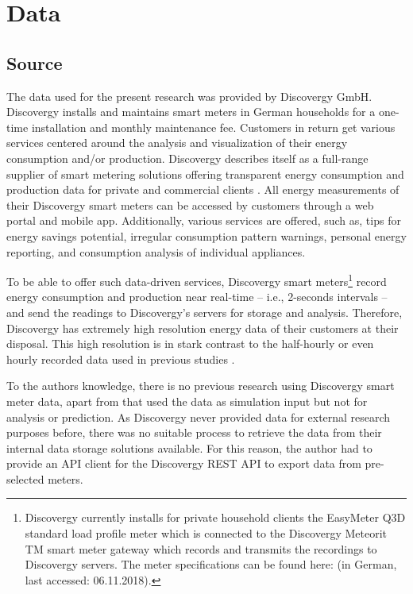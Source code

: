
\section{Data}\label{Sec:Data}




\subsection{Source}\label{Sec:Data;Subsec:Source}

The data used for the present research was provided by Discovergy GmbH. Discovergy installs and maintains smart meters in German households for a one-time installation and monthly maintenance fee. Customers in return get various services centered around the analysis and visualization of their energy consumption and/or production. Discovergy describes itself as a full-range supplier of smart metering solutions offering transparent energy consumption and production data for private and commercial clients \citep{Discovergy:2018}. All energy measurements of their Discovergy smart meters can be accessed by customers through a web portal and mobile app. Additionally, various services are offered, such as, tips for energy savings potential, irregular consumption pattern warnings, personal energy reporting, and consumption analysis of individual appliances.

To be able to offer such data-driven services, Discovergy smart meters\footnote{Discovergy currently installs for private household clients the EasyMeter Q3D standard load profile meter which is connected to the Discovergy Meteorit TM smart meter gateway which records and transmits the recordings to Discovergy servers. The meter specifications can be found here:  (in German, last accessed: 06.11.2018).} record energy consumption and production near real-time -- i.e., 2-seconds intervals -- and send the readings to Discovergy's servers for storage and analysis. Therefore, Discovergy has extremely high resolution energy data of their customers at their disposal. This high resolution is in stark contrast to the half-hourly or even hourly recorded data used in previous studies \citep[e.g.,][]{Arora:2016,Auder:2018,Shi:2017,Gerossier:2017}.

To the authors knowledge, there is no previous research using Discovergy smart meter data, apart from \citet{Teixeira:2017} that used the data as simulation input but not for analysis or prediction. As Discovergy never provided data for external research purposes before, there was no suitable process to retrieve the data from their internal data storage solutions available. For this reason, the author had to provide an API client for the Discovergy REST API to export data from pre-selected meters.



